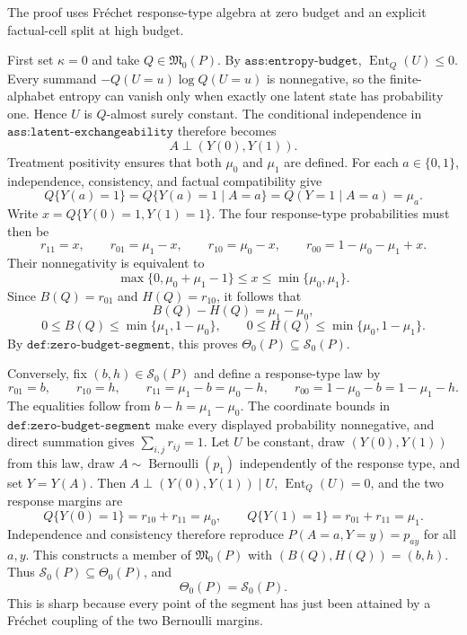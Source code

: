 The proof uses Fr\'echet response-type algebra at zero budget and an explicit factual-cell split at high budget.

First set \(\kappa=0\) and take \(Q\in\mathfrak M_0(P)\). By \(\texttt{ass:entropy-budget}\), \(\operatorname{Ent}_Q(U)\leq0\). Every summand \(-Q(U=u)\log Q(U=u)\) is nonnegative, so the finite-alphabet entropy can vanish only when exactly one latent state has probability one. Hence \(U\) is \(Q\)-almost surely constant. The conditional independence in \(\texttt{ass:latent-exchangeability}\) therefore becomes
\[
A\perp (Y(0),Y(1)).
\]
Treatment positivity ensures that both \(\mu_0\) and \(\mu_1\) are defined. For each \(a\in\{0,1\}\), independence, consistency, and factual compatibility give
\[
Q\{Y(a)=1\}
=Q\{Y(a)=1\mid A=a\}
=Q(Y=1\mid A=a)
=\mu_a.
\]
Write \(x=Q\{Y(0)=1,Y(1)=1\}\). The four response-type probabilities must then be
\[
r_{11}=x,\qquad
r_{01}=\mu_1-x,\qquad
r_{10}=\mu_0-x,\qquad
r_{00}=1-\mu_0-\mu_1+x.
\]
Their nonnegativity is equivalent to
\[
\max\{0,\mu_0+\mu_1-1\}\leq x\leq\min\{\mu_0,\mu_1\}.
\]
Since \(B(Q)=r_{01}\) and \(H(Q)=r_{10}\), it follows that
\[
B(Q)-H(Q)=\mu_1-\mu_0,
\]
\[
0\leq B(Q)\leq\min\{\mu_1,1-\mu_0\},\qquad
0\leq H(Q)\leq\min\{\mu_0,1-\mu_1\}.
\]
By \(\texttt{def:zero-budget-segment}\), this proves \(\Theta_0(P)\subseteq\mathcal S_0(P)\).

Conversely, fix \((b,h)\in\mathcal S_0(P)\) and define a response-type law by
\[
r_{01}=b,\qquad r_{10}=h,\qquad
r_{11}=\mu_1-b=\mu_0-h,\qquad
r_{00}=1-\mu_0-b=1-\mu_1-h.
\]
The equalities follow from \(b-h=\mu_1-\mu_0\). The coordinate bounds in \(\texttt{def:zero-budget-segment}\) make every displayed probability nonnegative, and direct summation gives \(\sum_{i,j}r_{ij}=1\). Let \(U\) be constant, draw \((Y(0),Y(1))\) from this law, draw \(A\sim\operatorname{Bernoulli}(p_1)\) independently of the response type, and set \(Y=Y(A)\). Then \(A\perp(Y(0),Y(1))\mid U\), \(\operatorname{Ent}_Q(U)=0\), and the two response margins are
\[
Q\{Y(0)=1\}=r_{10}+r_{11}=\mu_0,
\qquad
Q\{Y(1)=1\}=r_{01}+r_{11}=\mu_1.
\]
Independence and consistency therefore reproduce \(P(A=a,Y=y)=p_{ay}\) for all \(a,y\). This constructs a member of \(\mathfrak M_0(P)\) with \((B(Q),H(Q))=(b,h)\). Thus \(\mathcal S_0(P)\subseteq\Theta_0(P)\), and
\[
\Theta_0(P)=\mathcal S_0(P).
\]
This is sharp because every point of the segment has just been attained by a Fr\'echet coupling of the two Bernoulli margins.

